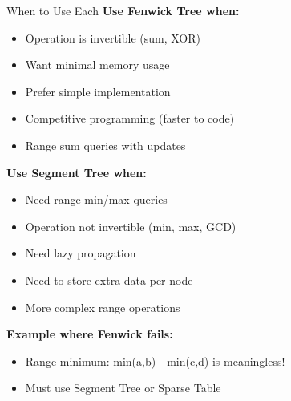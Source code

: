 \documentclass[aspectratio=169]{beamer}
\begin{document}
\begin{frame}{When to Use Each}
  \textbf{Use Fenwick Tree when:}
  \begin{itemize}
    \item Operation is invertible (sum, XOR)
    \item Want minimal memory usage
    \item Prefer simple implementation
    \item Competitive programming (faster to code)
    \item Range sum queries with updates
  \end{itemize}

  \vspace{0.5cm}
  \textbf{Use Segment Tree when:}
  \begin{itemize}
    \item Need range min/max queries
    \item Operation not invertible (min, max, GCD)
    \item Need lazy propagation
    \item Need to store extra data per node
    \item More complex range operations
  \end{itemize}

  \vspace{0.5cm}
  \textbf{Example where Fenwick fails:}
  \begin{itemize}
    \item Range minimum: min(a,b) - min(c,d) is meaningless!
    \item Must use Segment Tree or Sparse Table
  \end{itemize}
\end{frame}
\end{document}
